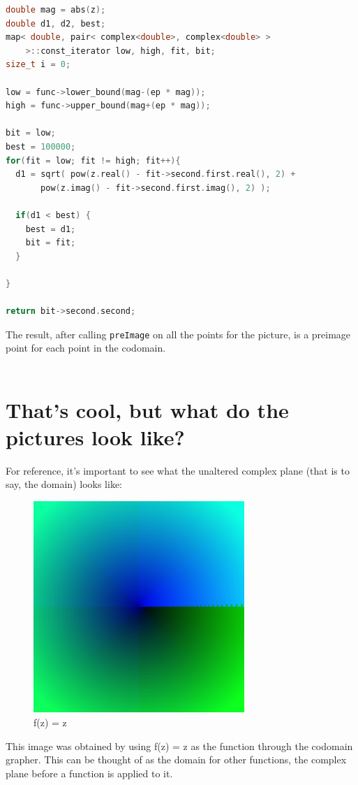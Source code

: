 \documentclass[letterpaper,12pt]{article}
\begin{document}
\begin{lstlisting}[language=c++]
double mag = abs(z);
double d1, d2, best;
map< double, pair< complex<double>, complex<double> >
    >::const_iterator low, high, fit, bit;
size_t i = 0;

low = func->lower_bound(mag-(ep * mag));
high = func->upper_bound(mag+(ep * mag));

bit = low;
best = 100000;
for(fit = low; fit != high; fit++){
  d1 = sqrt( pow(z.real() - fit->second.first.real(), 2) +
       pow(z.imag() - fit->second.first.imag(), 2) );

  if(d1 < best) {
    best = d1;
    bit = fit;
  }

}

return bit->second.second;

\end{lstlisting}

The result, after calling \verb|preImage| on all the points for the picture, is a preimage point for each point in the codomain. \\ \\

\section{That's cool, but what do the pictures look like?}

For reference, it's important to see what the unaltered complex plane (that is to say, the domain) looks like:

\begin{figure}[h]
	\includegraphics[width=8cm]{f(z)=z}
	\centering
	\caption{f(z) = z}
	\centering
\end{figure}

This image was obtained by using f(z) = z as the function through the codomain grapher.
This can be thought of as the domain for other functions, the complex plane before a function is applied to it.
\end{document}
